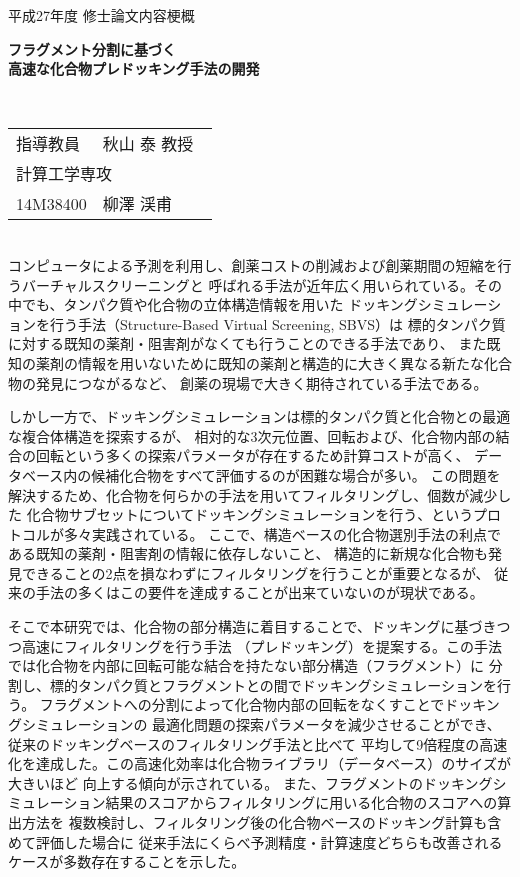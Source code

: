 {
 \thispagestyle{empty}
 \large
 \noindent
 平成27年度 修士論文内容梗概
　\\
 \begin{center}
  \textbf{\LARGE フラグメント分割に基づく\\高速な化合物プレドッキング手法の開発}
 \end{center}
　\\
 \hfill 
 \begin{tabular}{llll}
 指導教員& \multicolumn{3}{l}{秋山 泰 教授} \\
  \multicolumn{4}{l}{計算工学専攻} \\
 14M38400\hspace{.5cm} & {柳澤 渓甫}
 \end{tabular}

\mbox{}\\
コンピュータによる予測を利用し、創薬コストの削減および創薬期間の短縮を行うバーチャルスクリーニングと
呼ばれる手法が近年広く用いられている。その中でも、タンパク質や化合物の立体構造情報を用いた
ドッキングシミュレーションを行う手法（Structure-Based Virtual Screening, SBVS）は
標的タンパク質に対する既知の薬剤・阻害剤がなくても行うことのできる手法であり、
また既知の薬剤の情報を用いないために既知の薬剤と構造的に大きく異なる新たな化合物の発見につながるなど、
創薬の現場で大きく期待されている手法である。

しかし一方で、ドッキングシミュレーションは標的タンパク質と化合物との最適な複合体構造を探索するが、
相対的な3次元位置、回転および、化合物内部の結合の回転という多くの探索パラメータが存在するため計算コストが高く、
データベース内の候補化合物をすべて評価するのが困難な場合が多い。
この問題を解決するため、化合物を何らかの手法を用いてフィルタリングし、個数が減少した
化合物サブセットについてドッキングシミュレーションを行う、というプロトコルが多々実践されている。
ここで、構造ベースの化合物選別手法の利点である既知の薬剤・阻害剤の情報に依存しないこと、
構造的に新規な化合物も発見できることの2点を損なわずにフィルタリングを行うことが重要となるが、
従来の手法の多くはこの要件を達成することが出来ていないのが現状である。

そこで本研究では、化合物の部分構造に着目することで、ドッキングに基づきつつ高速にフィルタリングを行う手法
（プレドッキング）を提案する。この手法では化合物を内部に回転可能な結合を持たない部分構造（フラグメント）に
分割し、標的タンパク質とフラグメントとの間でドッキングシミュレーションを行う。
フラグメントへの分割によって化合物内部の回転をなくすことでドッキングシミュレーションの
最適化問題の探索パラメータを減少させることができ、従来のドッキングベースのフィルタリング手法と比べて
平均して9倍程度の高速化を達成した。この高速化効率は化合物ライブラリ（データベース）のサイズが大きいほど
向上する傾向が示されている。
また、フラグメントのドッキングシミュレーション結果のスコアからフィルタリングに用いる化合物のスコアへの算出方法を
複数検討し、フィルタリング後の化合物ベースのドッキング計算も含めて評価した場合に
従来手法にくらべ予測精度・計算速度どちらも改善されるケースが多数存在することを示した。

\thispagestyle{empty}
\addtocounter{page}{-1}
}
